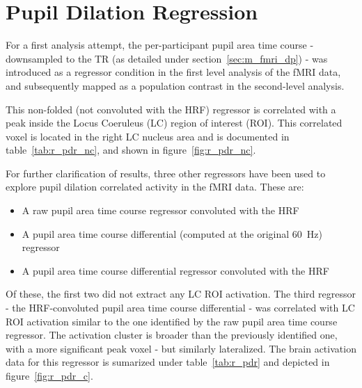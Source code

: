     \section{Pupil Dilation Regression}\label{sec:r_pdr}
	For a first analysis attempt, the per-participant pupil area time course - downsampled to the TR (as detailed under section~\ref{sec:m_fmri_dp}) - was introduced as a regressor condition in the first level analysis of the fMRI data, and subsequently mapped as a population contrast in the second-level analysis.
	
	This non-folded (not convoluted with the HRF) regressor is correlated with a peak inside the Locus Coeruleus (LC) region of interest (ROI).
	This correlated voxel is located in the right LC nucleus area and is documented in table~\ref{tab:r_pdr_nc}, and shown in figure~\ref{fig:r_pdr_nc}.
	
	For further clarification of results, three other regressors have been used to explore pupil dilation correlated activity in the fMRI data.
	These are:
	\begin{itemize}
	    \item A raw pupil area time course regressor convoluted with the HRF
	    \item A pupil area time course differential (computed at the original \SI{60}{\hertz}) regressor
	    \item A pupil area time course differential regressor convoluted with the HRF
	\end{itemize}
	
	Of these, the first two did not extract any LC ROI activation.
	The third regressor - the HRF-convoluted pupil area time course differential - was correlated with LC ROI activation similar to the one identified by the raw pupil area time course regressor.
	The activation cluster is broader than the previously identified one, with a more significant peak voxel - but similarly lateralized.
	The brain activation data for this regressor is sumarized under table~\ref{tab:r_pdr} and depicted in figure~\ref{fig:r_pdr_c}.
	

